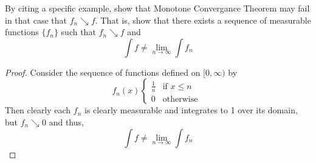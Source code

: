 \documentclass[nocolor]{report}
\begin{document}
\begin{ex}[Question 3.] By citing a specific example, show that Monotone Convergance Theorem may fail in that case that $f_n \searrow f$. That is, show that there exists a sequence of measurable functions $\{f_n\}$ such that $f_n \searrow f$ and 
$$\int f \neq \lim_{n\rightarrow\infty}\int f_n$$
\end{ex}
\begin{proof}
Consider the sequence of functions defined on $[0, \infty)$ by 
\begin{equation}
f_n(x)
    \begin{cases}
        \frac{1}{n} & \text{if } x \leq n\\
        0 & \text{otherwise } 
    \end{cases}
\end{equation}
Then clearly each $f_n$ is clearly measurable and integrates to 1 over its domain, but $f_n \searrow 0$ and thus,  
$$\int f \neq \lim_{n\rightarrow\infty}\int f_n$$
\end{proof}
\end{document}
